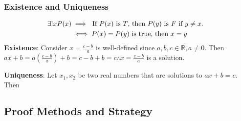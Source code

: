 \documentclass{article}
\begin{document}
\subsubsection{Existence and Uniqueness}

\begin{align*}
	\exists !x P(x) & \implies \text{ If $ P(x) $ is $ T $, then $ P(y) $ is $ F $ if $ y \neq x $. } \\
					& \iff P(x) = P(y) \text{ is true, then } x = y
\end{align*}
\textbf{Existence}: Consider $ x = \frac{ c - b }{ a } $ is well-defined since $ a, b, c \in \mathbb{R}, a \neq 0 $. Then $ ax + b = a \left( \frac{ c - b }{ a } \right) + b = c - b + b = c \therefore x = \frac{ c - b }{ a } $ is a solution.

\textbf{Uniqueness}: Let $ x_1, x_2 $ be two real numbers that are solutions to $ ax + b = c $. Then


\subsection{Proof Methods and Strategy}
\end{document}
